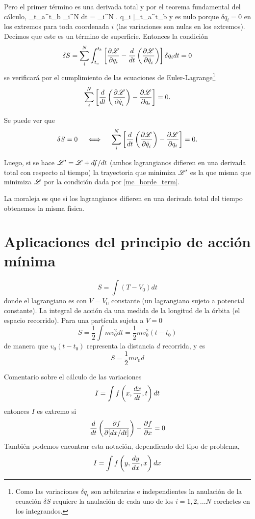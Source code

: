 \documentclass[10pt,oneside]{CBFT_book}
\begin{document}
Pero el primer término es una derivada total y por el teorema fundamental del cálculo,
\be
	\int_{t_a}^{t_b} \sum_i^N  dt =
	\sum_i^N \left.  \delta q_i \: \right|_{t_a}^{t_b}
\label{mc_borde_term}
\ee
y es nulo porque $\delta q_i=0$ en los extremos para toda coordenada $i$ (las variaciones son nulas en los extremos). 
Decimos que este es un término de superficie. Entonces la condición 
\[
	\delta S =  \sum_i^N  \int_{t_a}^{t_b}
	\left[ \frac{\partial^{\hspace{-0.05em}} {\mathscr{L}}}{\partial {q_i}^{\hspace{-0.05em}}} - \frac{d}{dt}\left( \frac{\partial^{\hspace{-0.05em}} {\mathscr{L}}}{\partial {\dot{q}_i}^{\hspace{-0.05em}}} \right)  \right]  \delta q_i  dt = 0
\]
se verificará por el cumplimiento de las ecuaciones de Euler-Lagrange\footnote{Como las variaciones $\delta q_i$ son 
arbitrarias e independientes la anulación de la ecuación $ \delta S $ requiere la anulación de cada uno de los 
$i=1,2,...N $ corchetes en los integrandos.}
\[
	\sum_i^N  \left[ \frac{d}{dt}\left( \frac{\partial^{\hspace{-0.05em}} {\mathscr{L}}}{\partial {\dot{q}_i}^{\hspace{-0.05em}}} \right) - \frac{\partial^{\hspace{-0.05em}} {\mathscr{L}}}{\partial {q_i}^{\hspace{-0.05em}}} \right] = 0.
\]

Se puede ver que 
\[
	\delta S = 0 \quad \iff \quad \sum_i^N  \left[ \frac{d}{dt}\left( \frac{\partial^{\hspace{-0.05em}} {\mathscr{L}}}{\partial {\dot{q}_i}^{\hspace{-0.05em}}} \right) -
	\frac{\partial^{\hspace{-0.05em}} {\mathscr{L}}}{\partial {q_i}^{\hspace{-0.05em}}} \right] = 0.
\]


Luego, si se hace $\mathscr{L}' = \mathscr{L} + df/dt$ (ambos lagrangianos difieren en una derivada total con 
respecto al tiempo) la trayectoria que minimiza $\mathscr{L}'$ es la que misma que minimiza
$\mathscr{L}$ por la condición dada por \eqref{mc_borde_term}. 

La moraleja es que si los lagrangianos difieren en una derivada total del tiempo obtenemos la misma
física.

\section{Aplicaciones del principio de acción mínima}

\[
	S = \int (T-V_0) dt
\]
donde el lagrangiano es con $V=V_0$ constante (un lagrangiano sujeto a potencial constante).
La integral de acción da una medida de la longitud de la órbita (el espacio recorrido).
Para una partícula sujeta a $V=0$
\[
	S = \frac{1}{2}\int m v_0^2 dt = \frac{1}{2}mv_0^2(t-t_0)
\]
de manera que $v_0(t-t_0)$ representa la distancia $d$ recorrida, y es 
\[
	S = \frac{1}{2}mv_0 d
\]

Comentario sobre el cálculo de las variaciones
\[
	I = \int f\left(x, \frac{d^{\hspace{-0.05em}} {x}}{d {t}^{\hspace{-0.05em}}}, t\right) dt 
\]
entonces $I$ es extremo si
\[
	\frac{d}{dt} \left( \frac{\partial^{\hspace{-0.05em}} {f}}{\partial {[dx/dt]}^{\hspace{-0.05em}}}\right) - \frac{\partial^{\hspace{-0.05em}} {f}}{\partial {x}^{\hspace{-0.05em}}} = 0
\]
También podemos encontrar esta notación, dependiendo del tipo de problema,
\[
	I = \int f\left(y, \frac{d^{\hspace{-0.05em}} {y}}{d {x}^{\hspace{-0.05em}}}, x\right) dx 
\]
\end{document}
